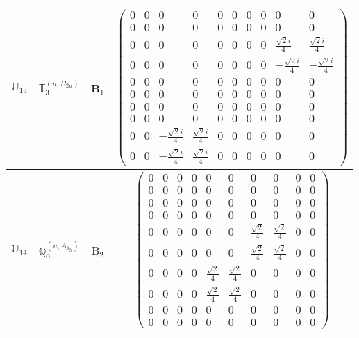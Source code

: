 \documentclass[fleqn,10pt,landscape]{article}
\begin{document}
\begin{itemize}
\begin{center}
\begin{longtable}{c|c|c|c}
$ \mathbb{U}_{13} $ & $\mathbb{T}_{3}^{(u,B_{2u})}$ & B$_{1}$ & $\begin{pmatrix} 0 & 0 & 0 & 0 & 0 & 0 & 0 & 0 & 0 & 0 \\ 0 & 0 & 0 & 0 & 0 & 0 & 0 & 0 & 0 & 0 \\ 0 & 0 & 0 & 0 & 0 & 0 & 0 & 0 & \frac{\sqrt{2} i}{4} & \frac{\sqrt{2} i}{4} \\ 0 & 0 & 0 & 0 & 0 & 0 & 0 & 0 & - \frac{\sqrt{2} i}{4} & - \frac{\sqrt{2} i}{4} \\ 0 & 0 & 0 & 0 & 0 & 0 & 0 & 0 & 0 & 0 \\ 0 & 0 & 0 & 0 & 0 & 0 & 0 & 0 & 0 & 0 \\ 0 & 0 & 0 & 0 & 0 & 0 & 0 & 0 & 0 & 0 \\ 0 & 0 & 0 & 0 & 0 & 0 & 0 & 0 & 0 & 0 \\ 0 & 0 & - \frac{\sqrt{2} i}{4} & \frac{\sqrt{2} i}{4} & 0 & 0 & 0 & 0 & 0 & 0 \\ 0 & 0 & - \frac{\sqrt{2} i}{4} & \frac{\sqrt{2} i}{4} & 0 & 0 & 0 & 0 & 0 & 0 \end{pmatrix}$ \\ \hline
$ \mathbb{U}_{14} $ & $\mathbb{Q}_{0}^{(u,A_{1g})}$ & B$_{2}$ & $\begin{pmatrix} 0 & 0 & 0 & 0 & 0 & 0 & 0 & 0 & 0 & 0 \\ 0 & 0 & 0 & 0 & 0 & 0 & 0 & 0 & 0 & 0 \\ 0 & 0 & 0 & 0 & 0 & 0 & 0 & 0 & 0 & 0 \\ 0 & 0 & 0 & 0 & 0 & 0 & 0 & 0 & 0 & 0 \\ 0 & 0 & 0 & 0 & 0 & 0 & \frac{\sqrt{2}}{4} & \frac{\sqrt{2}}{4} & 0 & 0 \\ 0 & 0 & 0 & 0 & 0 & 0 & \frac{\sqrt{2}}{4} & \frac{\sqrt{2}}{4} & 0 & 0 \\ 0 & 0 & 0 & 0 & \frac{\sqrt{2}}{4} & \frac{\sqrt{2}}{4} & 0 & 0 & 0 & 0 \\ 0 & 0 & 0 & 0 & \frac{\sqrt{2}}{4} & \frac{\sqrt{2}}{4} & 0 & 0 & 0 & 0 \\ 0 & 0 & 0 & 0 & 0 & 0 & 0 & 0 & 0 & 0 \\ 0 & 0 & 0 & 0 & 0 & 0 & 0 & 0 & 0 & 0 \end{pmatrix}$ \\

\end{longtable}
\end{center}
\end{itemize}
\end{document}
